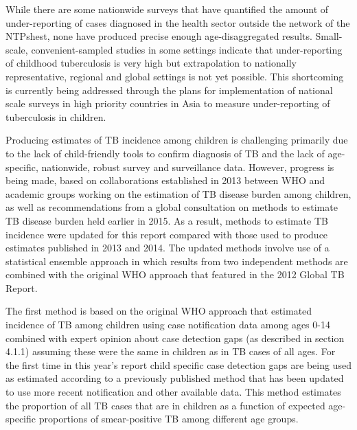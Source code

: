 While there are some nationwide surveys that have quantified the amount of under-reporting of cases diagnosed in the health sector outside the network of the NTPs\cite{20487611}\cite{17156496}hest\cite{18346285}, none have produced precise enough age-disaggregated results. Small-scale, convenient-sampled studies in some settings indicate that under-reporting of childhood tuberculosis is very high\cite{21985569}\cite{Coghlan2015-xn} but extrapolation to nationally representative, regional and global settings is not yet possible. This shortcoming is currently being addressed through the plans for implementation of national scale surveys in high priority countries in Asia to measure under-reporting of tuberculosis in children\cite{noauthor_2014-gv}.

Producing estimates of TB incidence among children is challenging primarily due to the lack of child-friendly tools to confirm diagnosis of TB and the lack of age-specific, nationwide, robust survey and surveillance data. However, progress is being made, based on collaborations established in 2013 between WHO and academic groups working on the estimation of TB disease burden among children, as well as recommendations from a global consultation on methods to estimate TB disease burden held earlier in 2015. As a result, methods to estimate TB incidence were updated for this report compared with those used to produce estimates published in 2013 and 2014. The updated methods involve use of a statistical ensemble approach in which results from two independent methods are combined with the original WHO approach that featured in the 2012 Global TB Report. 

The first method is based on the original WHO approach that estimated incidence of TB among children using case notification data among ages 0-14 combined with expert opinion about case detection gaps (as described in section 4.1.1) assuming these were the same in children as in TB cases of all ages. For the first time in this year’s report child specific case detection gaps are being used as estimated according to a previously published method\cite{Jenkins_2014} that has been updated to use more recent notification and other available data\cite{Sismanidis_2014}. This method estimates the proportion of all TB cases that are in children as a function of expected age-specific proportions of smear-positive TB among different age groups. 